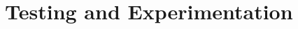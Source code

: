 \chapter{Testing and Experimentation}
\ifpdf
    \graphicspath{{Chapter3/Chapter3Figs/PNG/}{Chapter3/Chapter3Figs/PDF/}{Chapter3/Chapter3Figs/}}
\else
    \graphicspath{{Chapter3/Chapter3Figs/EPS/}{Chapter3/Chapter3Figs/}}
\fi


